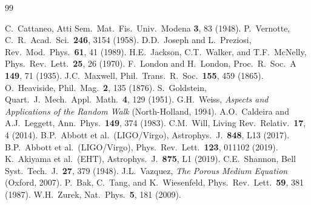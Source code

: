 \documentclass[reprint]{revtex4-2}
\begin{document}
\begin{thebibliography}{99}

 C.~Cattaneo, Atti Sem.\ Mat.\ Fis.\ Univ.\ Modena \textbf{3}, 83 (1948).
 P.~Vernotte, C.\ R.\ Acad.\ Sci.\ \textbf{246}, 3154 (1958).
 D.D.\ Joseph and L.\ Preziosi, Rev.\ Mod.\ Phys.\ \textbf{61}, 41 (1989).
 H.E.\ Jackson, C.T.\ Walker, and T.F.\ McNelly, Phys.\ Rev.\ Lett.\ \textbf{25}, 26 (1970).
 F.\ London and H.\ London, Proc.\ R.\ Soc.\ A \textbf{149}, 71 (1935).
 J.C.\ Maxwell, Phil.\ Trans.\ R.\ Soc.\ \textbf{155}, 459 (1865).
 O.\ Heaviside, Phil.\ Mag.\ \textbf{2}, 135 (1876).
 S.~Goldstein, Quart.\ J.\ Mech.\ Appl.\ Math.\ \textbf{4}, 129 (1951).
 G.H.\ Weiss, \emph{Aspects and Applications of the Random Walk} (North-Holland, 1994).
 A.O.\ Caldeira and A.J.\ Leggett, Ann.\ Phys.\ \textbf{149}, 374 (1983).
 C.M.\ Will, Living Rev.\ Relativ.\ \textbf{17}, 4 (2014).
 B.P.\ Abbott et al.\ (LIGO/Virgo), Astrophys.\ J.\ \textbf{848}, L13 (2017).
 B.P.\ Abbott et al.\ (LIGO/Virgo), Phys.\ Rev.\ Lett.\ \textbf{123}, 011102 (2019).
 K.~Akiyama et al.\ (EHT), Astrophys.\ J.\ \textbf{875}, L1 (2019).
 C.E.\ Shannon, Bell Syst.\ Tech.\ J.\ \textbf{27}, 379 (1948).
 J.L.\ Vazquez, \emph{The Porous Medium Equation} (Oxford, 2007).
 P.~Bak, C.~Tang, and K.~Wiesenfeld, Phys.\ Rev.\ Lett.\ \textbf{59}, 381 (1987).
 W.H.\ Zurek, Nat.\ Phys.\ \textbf{5}, 181 (2009).

\end{thebibliography}
\end{document}
